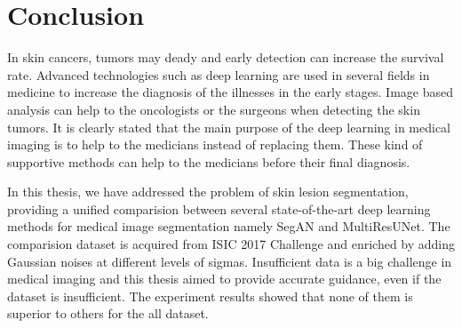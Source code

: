 \chapter{Conclusion}

    In skin cancers, tumors may deady and early detection can increase the survival rate.
    Advanced technologies such as deep learning are used in several fields in medicine to increase the diagnosis of the illnesses in the early stages.
    Image based analysis can help to the oncologists or the surgeons when detecting the skin tumors.
    It is clearly stated that the main purpose of the deep learning in medical imaging is to help to the medicians instead of replacing them.
    These kind of supportive methods can help to the medicians before their final diagnosis.

    In this thesis, we have addressed the problem of skin lesion segmentation, providing a unified comparision between several  state-of-the-art deep learning methods
    for medical image segmentation namely SegAN and MultiResUNet.
    The comparision dataset is acquired from ISIC 2017 Challenge and enriched by adding Gaussian noises at different levels of sigmas.
    Insufficient data is a big challenge in medical imaging and this thesis aimed to provide accurate guidance, even if the dataset is insufficient.
    The experiment results showed that none of them is superior to others for the all dataset.
